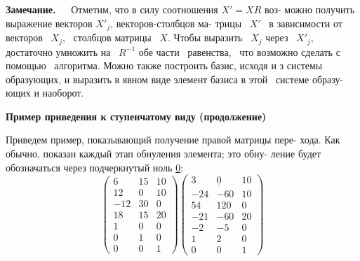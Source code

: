 \documentclass{mai_book}
\begin{document}
	\begin{flushleft}
	\hangindent=1cm  \noindent
	{\small {\bf Замечание.}${\ \ \ \ \ \ \ }$Отметим, что в силу соотношения $X' = XR$ воз-\linebreak
		можно получить выражение векторов $X'_j$, векторов-столбцов ма-\linebreak
		трицы \  $X'$ \ в зависимости от векторов \ $X_j$, \ столбцов матрицы \ $X$.\linebreak
		Чтобы выразить \ $X_j$ через \ $X'_j$, достаточно умножить на \ $R^{-1}$ обе\linebreak
		части \ равенства, \ что возможно сделать с помощью \ алгоритма.\linebreak
		Можно также построить базис, исходя и з системы образующих,\linebreak
		и выразить в явном виде элемент базиса в этой \ системе образу-\linebreak
		ющих и наоборот.}
	\end{flushleft}
	
	\noindent
	{\bf Пример приведения к ступенчатому виду (продолжение)}
	
	Приведем пример, показывающий получение правой матрицы пере-\linebreak
	хода. Как обычно, показан каждый этап обнуления элемента; это обну-\linebreak
	ление будет обозначаться через подчеркнутый ноль \underline{0}:
	$$\begin{pmatrix} 6 & 15 & 10 \\ 12 & 0 & 10 \\ -12 & 30 & 0 \\ 18 & 15 & 20 \\ 1 & 0 & 0 \\ 0 & 1 & 0 \\ 0 & 0 & 1\end{pmatrix}\begin{pmatrix} 3 & \underline{0} & 10 \\ -24 & -60 & 10 \\ 54 & 120 & 0 \\ -21 & -60 & 20 \\ -2 & -5 & 0 \\ 1 & 2 & 0 \\ 0 & 0 & 1\end{pmatrix}$$
	
	\pagebreak
	
	
\end{document}
